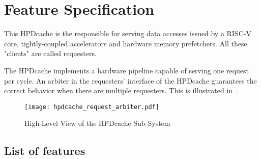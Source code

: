\documentclass[10pt,titlepage,twoside]{book}
\begin{document}
\ifdefined\isdraft
\listoftodos
\newpage
\fi


%
%


\chapter{Feature Specification}%
\minitoc
\newpage

This \acf{HPDcache} is the responsible for serving data accesses issued by a RISC-V core, tightly-coupled accelerators and hardware memory prefetchers.
All these "clients" are called requesters.

The \ac{HPDcache} implements a hardware pipeline capable of serving one request per cycle.
An arbiter in the requesters' interface of the \ac{HPDcache} guarantees the correct behavior when there are multiple requesters.
This is illustrated in~.

\begin{figure}[htbp]
  \texttt{[image: hpdcache\_request\_arbiter.pdf]}
  \caption{High-Level View of the HPDcache Sub-System}
\end{figure}

\newpage
\section{List of features}
\end{document}
